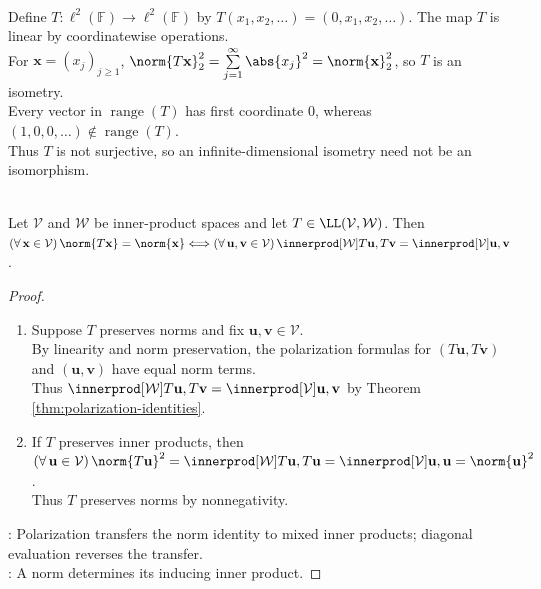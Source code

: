 \begin{counterexample} \label{cex:l2-shift-isometry-not-surjective} \\
Define $T:\ell^2(\mathbb{F})\to\ell^2(\mathbb{F})$ by $T(x_1,x_2,\ldots)=(0,x_1,x_2,\ldots)$. The map $T$ is linear by coordinatewise operations.\\
For $\mathbf{x}=(x_j)_{j\geq1}$, $\norm{T\mathbf{x}}_2^2=\sum\limits_{j=1}^{\infty}\abs{x_j}^2=\norm{\mathbf{x}}_2^2$, so $T$ is an isometry.\\
Every vector in $\operatorname{range}(T)$ has first coordinate $0$, whereas $(1,0,0,\ldots)\notin\operatorname{range}(T)$.\\
Thus $T$ is not surjective, so an infinite-dimensional isometry need not be an isomorphism.
\end{counterexample}

\begin{theorem} \label{thm:isometry-iff-inner-product-preserving} \\
Let $\mathcal{V}$ and $\mathcal{W}$ be inner-product spaces and let $T\in\LL(\mathcal{V},\mathcal{W})$. Then $(\forall\,\mathbf{x}\in\mathcal{V})\,\norm{T\mathbf{x}}=\norm{\mathbf{x}}\Longleftrightarrow(\forall\,\mathbf{u},\mathbf{v}\in\mathcal{V})\,\innerprod[\mathcal{W}]{T\mathbf{u},T\mathbf{v}}=\innerprod[\mathcal{V}]{\mathbf{u},\mathbf{v}}$.
\begin{proof}
\begin{enumerate}[label=\roman*.]
\setlength{\itemsep}{0pt}
\item[$(\Rightarrow)$] Suppose $T$ preserves norms and fix $\mathbf{u},\mathbf{v}\in\mathcal{V}$.\\
By linearity and norm preservation, the polarization formulas for $(T\mathbf{u},T\mathbf{v})$ and $(\mathbf{u},\mathbf{v})$ have equal norm terms.\\
Thus $\innerprod[\mathcal{W}]{T\mathbf{u},T\mathbf{v}}=\innerprod[\mathcal{V}]{\mathbf{u},\mathbf{v}}$ by Theorem \ref{thm:polarization-identities}.
\item[$(\Leftarrow)$] If $T$ preserves inner products, then $(\forall\,\mathbf{u}\in\mathcal{V})\,\norm{T\mathbf{u}}^2=\innerprod[\mathcal{W}]{T\mathbf{u},T\mathbf{u}}=\innerprod[\mathcal{V}]{\mathbf{u},\mathbf{u}}=\norm{\mathbf{u}}^2$.\\
Thus $T$ preserves norms by nonnegativity.
\end{enumerate}
: Polarization transfers the norm identity to mixed inner products; diagonal evaluation reverses the transfer.\\
: A norm determines its inducing inner product.
\end{proof}
\end{theorem}

